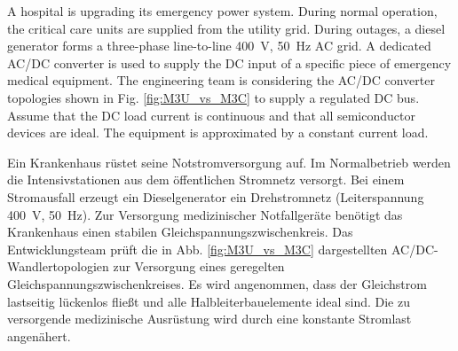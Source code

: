 

A hospital is upgrading its emergency power system. During normal operation, the critical care units
are supplied from the utility grid. During outages, a diesel generator forms a three-phase line-to-line
\SI{400}{\volt}, \SI{50}{\hertz} AC grid. A dedicated AC/DC converter is used to supply the DC input of a
specific piece of emergency medical equipment. The engineering team is considering the AC/DC converter
topologies shown in Fig. \ref{fig:M3U_vs_M3C} to supply a regulated DC bus.
Assume that the DC load current is continuous and that all semiconductor devices are ideal.
The equipment is approximated by a constant current load.

\begin{germanblock}
	Ein Krankenhaus rüstet seine Notstromversorgung auf. Im Normalbetrieb werden die Intensivstationen aus
	dem öffentlichen Stromnetz versorgt. Bei einem Stromausfall erzeugt ein Dieselgenerator ein Drehstromnetz
	(Leiterspannung \SI{400}{\volt}, \SI{50}{\hertz}). Zur Versorgung medizinischer Notfallgeräte benötigt
	das Krankenhaus einen stabilen Gleichspannungszwischenkreis. Das Entwicklungsteam prüft die in Abb. \ref{fig:M3U_vs_M3C}
	dargestellten AC/DC-Wandlertopologien zur Versorgung eines geregelten Gleichspannungszwischenkreises.
	Es wird angenommen, dass der Gleichstrom lastseitig lückenlos fließt und alle Halbleiterbauelemente ideal
	sind. Die zu versorgende medizinische Ausrüstung wird durch eine konstante Stromlast angenähert.
\end{germanblock}


